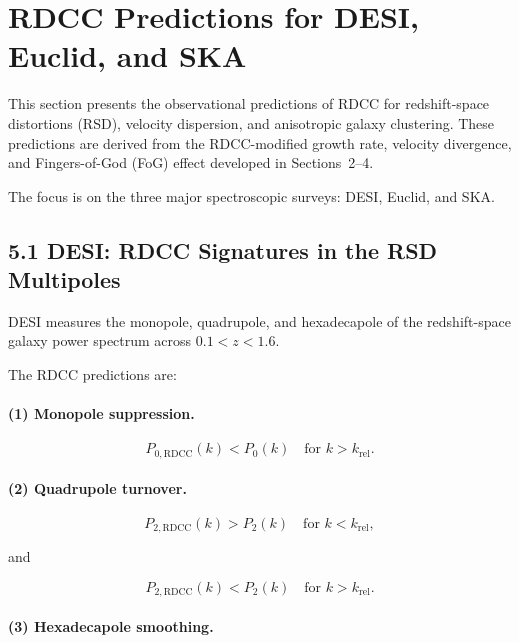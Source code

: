 \documentclass[11pt,a4paper]{article}
\begin{document}

\section{RDCC Predictions for DESI, Euclid, and SKA}

This section presents the observational predictions of RDCC for redshift-space distortions
(RSD), velocity dispersion, and anisotropic galaxy clustering. These predictions are derived
from the RDCC-modified growth rate, velocity divergence, and Fingers-of-God (FoG) effect
developed in Sections~2–4.

The focus is on the three major spectroscopic surveys:
DESI, Euclid, and SKA.

\subsection{5.1 DESI: RDCC Signatures in the RSD Multipoles}

DESI measures the monopole, quadrupole, and hexadecapole of the redshift-space galaxy
power spectrum across $0.1 < z < 1.6$.

The RDCC predictions are:

\paragraph{(1) Monopole suppression.}


\[
P_{0,\mathrm{RDCC}}(k)
<
P_{0}(k)
\quad \text{for } k > k_{\mathrm{rel}}.
\]



\paragraph{(2) Quadrupole turnover.}


\[
P_{2,\mathrm{RDCC}}(k)
>
P_{2}(k)
\quad \text{for } k < k_{\mathrm{rel}},
\]


and


\[
P_{2,\mathrm{RDCC}}(k)
<
P_{2}(k)
\quad \text{for } k > k_{\mathrm{rel}}.
\]



\paragraph{(3) Hexadecapole smoothing.}
\end{document}
